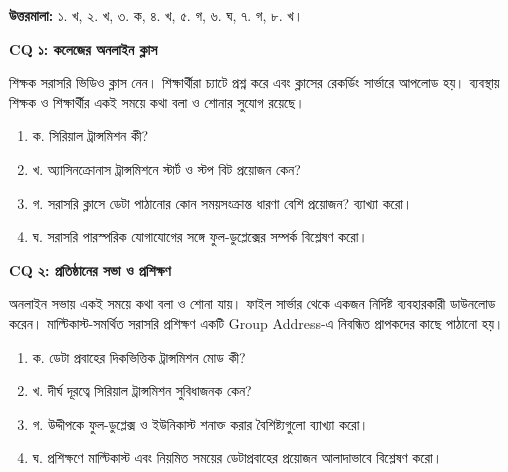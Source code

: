 \textbf{উত্তরমালা:} ১. খ, ২. খ, ৩. ক, ৪. খ, ৫. গ, ৬. ঘ, ৭. গ, ৮. খ।

\par{}
\textbf{CQ ১: কলেজের অনলাইন ক্লাস}\par
শিক্ষক সরাসরি ভিডিও ক্লাস নেন। শিক্ষার্থীরা চ্যাটে প্রশ্ন করে এবং ক্লাসের রেকর্ডিং সার্ভারে আপলোড হয়। ব্যবস্থায় শিক্ষক ও শিক্ষার্থীর একই সময়ে কথা বলা ও শোনার সুযোগ রয়েছে।
\begin{enumerate}
\item ক. সিরিয়াল ট্রান্সমিশন কী?
\item খ. অ্যাসিনক্রোনাস ট্রান্সমিশনে স্টার্ট ও স্টপ বিট প্রয়োজন কেন?
\item গ. সরাসরি ক্লাসে ডেটা পাঠানোর কোন সময়সংক্রান্ত ধারণা বেশি প্রয়োজন? ব্যাখ্যা করো।
\item ঘ. সরাসরি পারস্পরিক যোগাযোগের সঙ্গে ফুল-ডুপ্লেক্সের সম্পর্ক বিশ্লেষণ করো।
\end{enumerate}

\par{}
\textbf{CQ ২: প্রতিষ্ঠানের সভা ও প্রশিক্ষণ}\par
অনলাইন সভায় একই সময়ে কথা বলা ও শোনা যায়। ফাইল সার্ভার থেকে একজন নির্দিষ্ট ব্যবহারকারী ডাউনলোড করেন। মাল্টিকাস্ট-সমর্থিত সরাসরি প্রশিক্ষণ একটি Group Address-এ নিবন্ধিত প্রাপকদের কাছে পাঠানো হয়।
\begin{enumerate}
\item ক. ডেটা প্রবাহের দিকভিত্তিক ট্রান্সমিশন মোড কী?
\item খ. দীর্ঘ দূরত্বে সিরিয়াল ট্রান্সমিশন সুবিধাজনক কেন?
\item গ. উদ্দীপকে ফুল-ডুপ্লেক্স ও ইউনিকাস্ট শনাক্ত করার বৈশিষ্ট্যগুলো ব্যাখ্যা করো।
\item ঘ. প্রশিক্ষণে মাল্টিকাস্ট এবং নিয়মিত সময়ের ডেটাপ্রবাহের প্রয়োজন আলাদাভাবে বিশ্লেষণ করো।
\end{enumerate}
\endgroup
